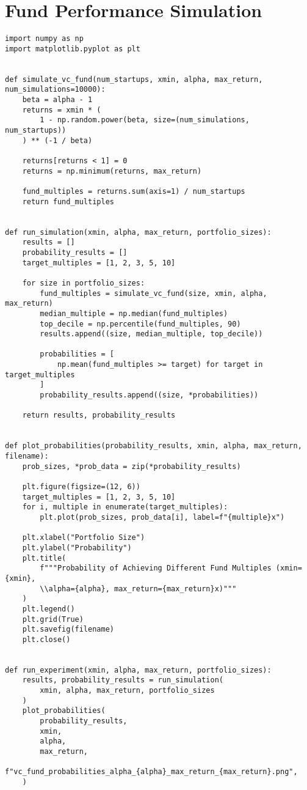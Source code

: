 \documentclass[a4paper, oneside]{discothesis}
\begin{document}
\chapter{Fund Performance Simulation}

\begin{verbatim}
import numpy as np
import matplotlib.pyplot as plt


def simulate_vc_fund(num_startups, xmin, alpha, max_return, num_simulations=10000):
    beta = alpha - 1
    returns = xmin * (
        1 - np.random.power(beta, size=(num_simulations, num_startups))
    ) ** (-1 / beta)

    returns[returns < 1] = 0
    returns = np.minimum(returns, max_return)

    fund_multiples = returns.sum(axis=1) / num_startups
    return fund_multiples


def run_simulation(xmin, alpha, max_return, portfolio_sizes):
    results = []
    probability_results = []
    target_multiples = [1, 2, 3, 5, 10]

    for size in portfolio_sizes:
        fund_multiples = simulate_vc_fund(size, xmin, alpha, max_return)
        median_multiple = np.median(fund_multiples)
        top_decile = np.percentile(fund_multiples, 90)
        results.append((size, median_multiple, top_decile))

        probabilities = [
            np.mean(fund_multiples >= target) for target in target_multiples
        ]
        probability_results.append((size, *probabilities))

    return results, probability_results


def plot_probabilities(probability_results, xmin, alpha, max_return, filename):
    prob_sizes, *prob_data = zip(*probability_results)

    plt.figure(figsize=(12, 6))
    target_multiples = [1, 2, 3, 5, 10]
    for i, multiple in enumerate(target_multiples):
        plt.plot(prob_sizes, prob_data[i], label=f"{multiple}x")

    plt.xlabel("Portfolio Size")
    plt.ylabel("Probability")
    plt.title(
        f"""Probability of Achieving Different Fund Multiples (xmin={xmin}, 
        \\alpha={alpha}, max_return={max_return}x)"""
    )
    plt.legend()
    plt.grid(True)
    plt.savefig(filename)
    plt.close()


def run_experiment(xmin, alpha, max_return, portfolio_sizes):
    results, probability_results = run_simulation(
        xmin, alpha, max_return, portfolio_sizes
    )
    plot_probabilities(
        probability_results,
        xmin,
        alpha,
        max_return,
        f"vc_fund_probabilities_alpha_{alpha}_max_return_{max_return}.png",
    )



\end{verbatim}
\end{document}
